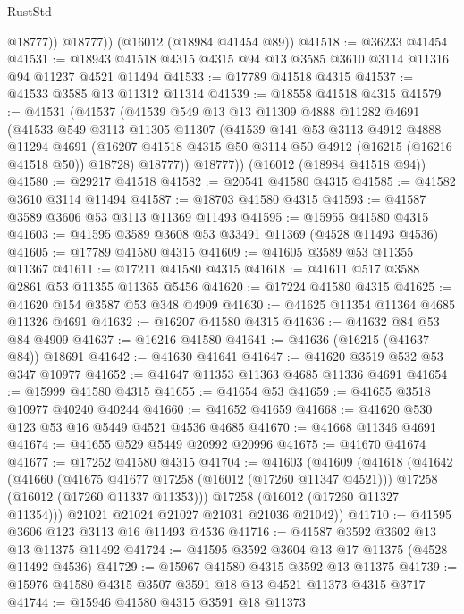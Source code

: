 \begin{lexlean}{RustStd}
\begin{coremodule}
            @18777))
        @18777))
    (@16012 (@18984 @41454 @89))
@41518 := @36233 @41454
@41531 := @18943 @41518 @4315 @4315 @94 @13 @3585 @3610 @3114 @11316 @94 @11237 @4521 @11494
@41533 := @17789 @41518 @4315
@41537 := @41533 @3585 @13 @11312 @11314
@41539 := @18558 @41518 @4315
@41579 := @41531
    (@41537
      (@41539
        @549
        @13
        @13
        @11309
        @4888
        @11282
        @4691
        (@41533
          @549
          @3113
          @11305
          @11307
          (@41539
            @141
            @53
            @3113
            @4912
            @4888
            @11294
            @4691
            (@16207 @41518 @4315 @50 @3114 @50 @4912 (@16215 (@16216 @41518 @50)) @18728)
            @18777))
        @18777))
    (@16012 (@18984 @41518 @94))
@41580 := @29217 @41518
@41582 := @20541 @41580 @4315
@41585 := @41582 @3610 @3114 @11494
@41587 := @18703 @41580 @4315
@41593 := @41587 @3589 @3606 @53 @3113 @11369 @11493
@41595 := @15955 @41580 @4315
@41603 := @41595 @3589 @3608 @53 @33491 @11369 (@4528 @11493 @4536)
@41605 := @17789 @41580 @4315
@41609 := @41605 @3589 @53 @11355 @11367
@41611 := @17211 @41580 @4315
@41618 := @41611 @517 @3588 @2861 @53 @11355 @11365 @5456
@41620 := @17224 @41580 @4315
@41625 := @41620 @154 @3587 @53 @348 @4909
@41630 := @41625 @11354 @11364 @4685 @11326 @4691
@41632 := @16207 @41580 @4315
@41636 := @41632 @84 @53 @84 @4909
@41637 := @16216 @41580
@41641 := @41636 (@16215 (@41637 @84)) @18691
@41642 := @41630 @41641
@41647 := @41620 @3519 @532 @53 @347 @10977
@41652 := @41647 @11353 @11363 @4685 @11336 @4691
@41654 := @15999 @41580 @4315
@41655 := @41654 @53
@41659 := @41655 @3518 @10977 @40240 @40244
@41660 := @41652 @41659
@41668 := @41620 @530 @123 @53 @16 @5449 @4521 @4536 @4685
@41670 := @41668 @11346 @4691
@41674 := @41655 @529 @5449 @20992 @20996
@41675 := @41670 @41674
@41677 := @17252 @41580 @4315
@41704 := @41603
    (@41609
      (@41618
        (@41642
          (@41660
            (@41675 @41677 @17258 (@16012 (@17260 @11347 @4521)))
            @17258
            (@16012 (@17260 @11337 @11353)))
          @17258
          (@16012 (@17260 @11327 @11354)))
        @21021
        @21024
        @21027
        @21031
        @21036
        @21042))
@41710 := @41595 @3606 @123 @3113 @16 @11493 @4536
@41716 := @41587 @3592 @3602 @13 @13 @11375 @11492
@41724 := @41595 @3592 @3604 @13 @17 @11375 (@4528 @11492 @4536)
@41729 := @15967 @41580 @4315 @3592 @13 @11375
@41739 := @15976 @41580 @4315 @3507 @3591 @18 @13 @4521 @11373 @4315 @3717
@41744 := @15946 @41580 @4315 @3591 @18 @11373

\end{coremodule}
\end{lexlean}
